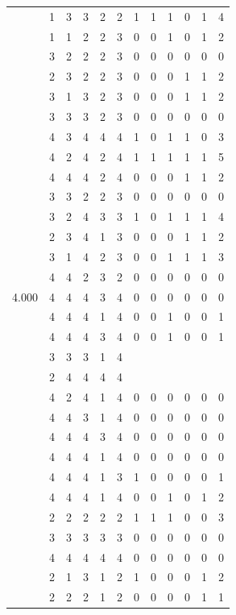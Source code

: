 \documentclass[]{msu-thesis}
\theoremstyle{definition}
\theoremstyle{definition}
\theoremstyle{definition}
\theoremstyle{remark}
\begin{document}
\begin{table}
{\begin{tabular}[t]{rrrrrrrrrrrr}
 & 1 & 3 & 3 & 2 & 2 & 1 & 1 & 1 & 0 & 1 & 4\\
 & 1 & 1 & 2 & 2 & 3 & 0 & 0 & 1 & 0 & 1 & 2\\
 & 3 & 2 & 2 & 2 & 3 & 0 & 0 & 0 & 0 & 0 & 0\\
 & 2 & 3 & 2 & 2 & 3 & 0 & 0 & 0 & 1 & 1 & 2\\
 & 3 & 1 & 3 & 2 & 3 & 0 & 0 & 0 & 1 & 1 & 2\\
 & 3 & 3 & 3 & 2 & 3 & 0 & 0 & 0 & 0 & 0 & 0\\
 & 4 & 3 & 4 & 4 & 4 & 1 & 0 & 1 & 1 & 0 & 3\\
 & 4 & 2 & 4 & 2 & 4 & 1 & 1 & 1 & 1 & 1 & 5\\
 & 4 & 4 & 4 & 2 & 4 & 0 & 0 & 0 & 1 & 1 & 2\\
 & 3 & 3 & 2 & 2 & 3 & 0 & 0 & 0 & 0 & 0 & 0\\
 & 3 & 2 & 4 & 3 & 3 & 1 & 0 & 1 & 1 & 1 & 4\\
 & 2 & 3 & 4 & 1 & 3 & 0 & 0 & 0 & 1 & 1 & 2\\
 & 3 & 1 & 4 & 2 & 3 & 0 & 0 & 1 & 1 & 1 & 3\\
 & 4 & 4 & 2 & 3 & 2 & 0 & 0 & 0 & 0 & 0 & 0\\
4.000 & 4 & 4 & 4 & 3 & 4 & 0 & 0 & 0 & 0 & 0 & 0\\
 & 4 & 4 & 4 & 1 & 4 & 0 & 0 & 1 & 0 & 0 & 1\\
 & 4 & 4 & 4 & 3 & 4 & 0 & 0 & 1 & 0 & 0 & 1\\
 & 3 & 3 & 3 & 1 & 4 &  &  &  &  &  & \\
 & 2 & 4 & 4 & 4 & 4 &  &  &  &  &  & \\
 & 4 & 2 & 4 & 1 & 4 & 0 & 0 & 0 & 0 & 0 & 0\\
 & 4 & 4 & 3 & 1 & 4 & 0 & 0 & 0 & 0 & 0 & 0\\
 & 4 & 4 & 4 & 3 & 4 & 0 & 0 & 0 & 0 & 0 & 0\\
 & 4 & 4 & 4 & 1 & 4 & 0 & 0 & 0 & 0 & 0 & 0\\
 & 4 & 4 & 4 & 1 & 3 & 1 & 0 & 0 & 0 & 0 & 1\\
 & 4 & 4 & 4 & 1 & 4 & 0 & 0 & 1 & 0 & 1 & 2\\
 & 2 & 2 & 2 & 2 & 2 & 1 & 1 & 1 & 0 & 0 & 3\\
 & 3 & 3 & 3 & 3 & 3 & 0 & 0 & 0 & 0 & 0 & 0\\
 & 4 & 4 & 4 & 4 & 4 & 0 & 0 & 0 & 0 & 0 & 0\\
 & 2 & 1 & 3 & 1 & 2 & 1 & 0 & 0 & 0 & 1 & 2\\
 & 2 & 2 & 2 & 1 & 2 & 0 & 0 & 0 & 0 & 1 & 1\\

\end{tabular}}
\end{table}
\end{document}
